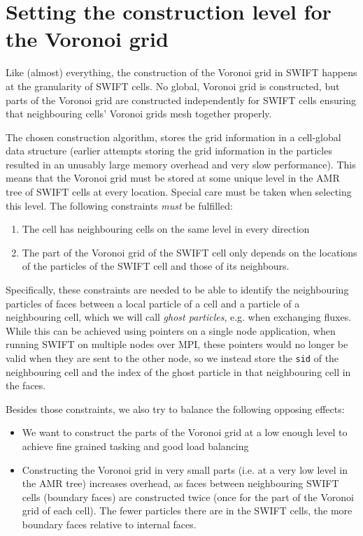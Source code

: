 

\section{Setting the construction level for the Voronoi grid}

Like (almost) everything, the construction of the Voronoi grid in SWIFT happens at the granularity of SWIFT cells. 
No global, Voronoi grid is constructed, but parts of the Voronoi grid are constructed independently for SWIFT cells ensuring that neighbouring cells' Voronoi grids mesh together properly.

The chosen construction algorithm, stores the grid information in a cell-global data structure (earlier attempts storing the grid information in the particles resulted in an unusably large memory overhead and very slow performance). 
This means that the Voronoi grid must be stored at some unique level in the AMR tree of SWIFT cells at every location.
Special care must be taken when selecting this level. The following constraints \emph{must} be fulfilled:
\begin{enumerate}
    \item The cell has neighbouring cells on the same level in every direction
    \item The part of the Voronoi grid of the SWIFT cell only depends on the locations of the particles of the SWIFT cell and those of its neighbours.
\end{enumerate}

Specifically, these constraints are needed to be able to identify the neighbouring particles of faces between a local particle of a cell and a particle of a neighbouring cell, which we will call \emph{ghost particles}, e.g. when exchanging fluxes. While this can be achieved using pointers on a single node application, when running SWIFT on multiple nodes over MPI, these pointers would no longer be valid when they are sent to the other node, so we instead store the \texttt{sid} of the neighbouring cell and the index of the ghost particle in that neighbouring cell in the faces.

Besides those constraints, we also try to balance the following opposing effects:
\begin{itemize}
    \item We want to construct the parts of the Voronoi grid at a low enough level to achieve fine grained tasking and good load balancing
    \item Constructing the Voronoi grid in very small parts (i.e. at a very low level in the AMR tree) increases overhead, as faces between neighbouring SWIFT cells (boundary faces) are constructed twice (once for the part of the Voronoi grid of each cell). The fewer particles there are in the SWIFT cells, the more boundary faces relative to internal faces. 
\end{itemize}

